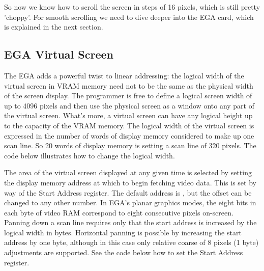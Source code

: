 \documentclass[book.tex]{subfiles}
\begin{document}
So now we know how to scroll the screen in steps of 16 pixels, which is still pretty 'choppy'. For smooth scrolling we need to dive deeper into the EGA card, which is explained in the next section.\\


\subsection{EGA Virtual Screen}

The EGA adds a powerful twist to linear addressing: the logical width of the virtual screen in VRAM memory need not to be the same as the physical width of the screen display. The programmer is free to define a logical screen width of up to 4096 pixels and then use the physical screen as a window onto any part of the virtual screen. What's more, a virtual screen can have any logical height up to the capacity of the VRAM memory. The logical width of the virtual screen is expressed in the number of words of display memory considered to make up one scan line. So 20 words of display memory is setting a scan line of 320 pixels. The code below illustrates how to change the logical width.\\

\begin{minipage}{\textwidth}
  
  \end{minipage}
  \label{ega_pel_pan}
  \par

The area of the virtual screen displayed at any given time is selected by setting the display memory address at which to begin fetching video data. This is set by way of the Start Address register. The default address is , but the offset can be changed to any other number. In EGA's planar graphics modes, the eight bits in each byte of video RAM correspond to eight consecutive pixels on-screen. Panning down a scan line requires only that the start address is increased by the logical width in bytes. Horizontal panning is possible by increasing the start address by one byte, although in this case only relative coarse of 8 pixels (1 byte)  adjustments are supported. See the code below how to set the Start Address register.

\begin{minipage}{\textwidth}
  
  \end{minipage}
  \label{ega_set_address}
  \par
\end{document}
